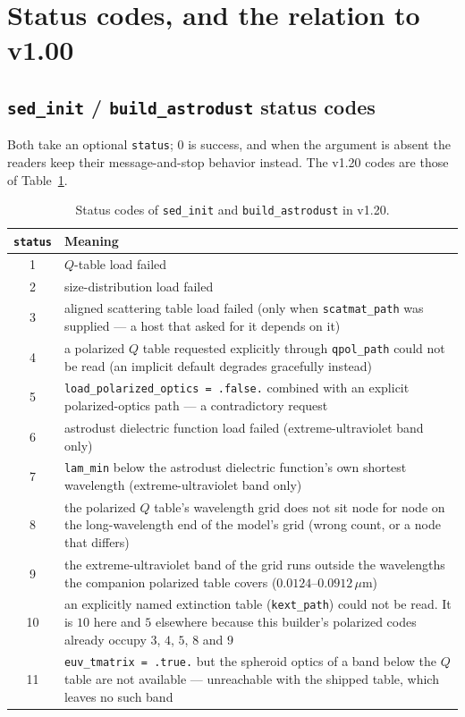\documentclass{my_memo}
\newcommand{\code}[1]{\texttt{#1}}
\newcommand{\um}{\ensuremath{\,\mu\mathrm{m}}}
\begin{document}
\section{Status codes, and the relation to v1.00}\label{sec:status}

\subsection{\code{sed\_init} / \code{build\_astrodust} status codes}

Both take an optional \code{status}; $0$ is success, and when the argument is
absent the readers keep their message-and-stop behavior instead. The v1.20 codes
are those of Table~\ref{tab:status}.

\begin{table}[h]
\centering
\small
\begin{tabular}{@{}cp{}@{}}
\toprule
\code{status} & Meaning \\
\midrule
1 & $Q$-table load failed \\
2 & size-distribution load failed \\
3 & aligned scattering table load failed (only when \code{scatmat\_path} was
    supplied --- a host that asked for it depends on it) \\
4 & a polarized $Q$ table requested explicitly through \code{qpol\_path} could
    not be read (an implicit default degrades gracefully instead) \\
5 & \code{load\_polarized\_optics = .false.} combined with an explicit
    polarized-optics path --- a contradictory request \\
6 & astrodust dielectric function load failed (extreme-ultraviolet band only) \\
7 & \code{lam\_min} below the astrodust dielectric function's own shortest
    wavelength (extreme-ultraviolet band only) \\
8 & the polarized $Q$ table's wavelength grid does not sit node for node on
    the long-wavelength end of the model's grid (wrong count, or a node that
    differs) \\
9 & the extreme-ultraviolet band of the grid runs outside the wavelengths the
    companion polarized table covers ($0.0124$--$0.0912\um$) \\
10 & an explicitly named extinction table (\code{kext\_path}) could not be
    read. It is $10$ here and $5$ elsewhere because this builder's polarized
    codes already occupy $3$, $4$, $5$, $8$ and $9$ \\
11 & \code{euv\_tmatrix = .true.} but the spheroid optics of a band below the
    $Q$ table are not available --- unreachable with the shipped table, which
    leaves no such band \\
\bottomrule
\end{tabular}
\caption{Status codes of \code{sed\_init} and \code{build\_astrodust} in v1.20.}
\label{tab:status}
\end{table}
\end{document}
